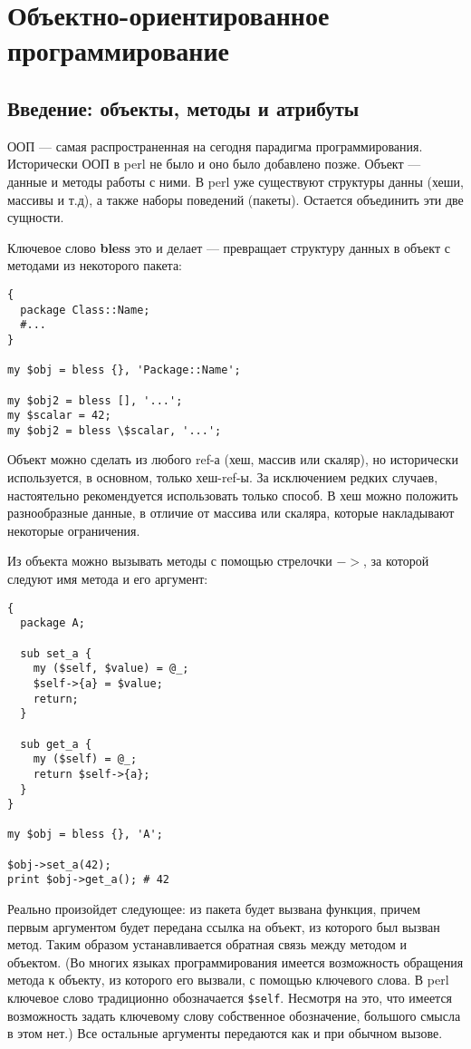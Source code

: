 \setcounter{chapter}{5}
\chapter{Объектно-ориентированное программирование}
\section{Введение: объекты, методы и атрибуты} %
ООП --- самая распространенная на сегодня парадигма программирования. Исторически ООП в perl не было и оно было добавлено позже. Объект --- данные и методы работы с ними. В perl уже существуют структуры данны (хеши, массивы и т.д), а также наборы поведений (пакеты). Остается объединить эти две сущности.

Ключевое слово \textbf{bless} это и делает --- превращает структуру данных в объект с методами из некоторого пакета:
\begin{verbatim}
{
  package Class::Name;
  #...
}

my $obj = bless {}, 'Package::Name';

my $obj2 = bless [], '...';
my $scalar = 42;
my $obj2 = bless \$scalar, '...';

\end{verbatim}
Объект можно сделать из любого ref-а (хеш, массив или скаляр), но исторически используется, в основном, только хеш-ref-ы. За исключением редких случаев, настоятельно рекомендуется использовать только способ. В хеш можно положить разнообразные данные, в отличие от массива или скаляра, которые накладывают некоторые ограничения.

Из объекта можно вызывать методы с помощью стрелочки $->$, за которой следуют имя метода и его аргумент:
\begin{verbatim}
{
  package A;

  sub set_a {
    my ($self, $value) = @_;
    $self->{a} = $value;
    return;
  }

  sub get_a {
    my ($self) = @_;
    return $self->{a};
  }
}

my $obj = bless {}, 'A';

$obj->set_a(42);
print $obj->get_a(); # 42
\end{verbatim}
Реально произойдет следующее: из пакета будет вызвана функция, причем первым аргументом будет передана ссылка на объект, из которого был вызван метод. Таким образом устанавливается обратная связь между методом и объектом.
(Во многих языках программирования имеется возможность обращения метода к объекту, из которого его вызвали, с помощью ключевого слова. В perl ключевое слово традиционно обозначается \verb|$self|. Несмотря на это, что имеется возможность задать ключевому слову собственное обозначение, большого смысла в этом нет.) Все остальные аргументы передаются как и при обычном вызове.

